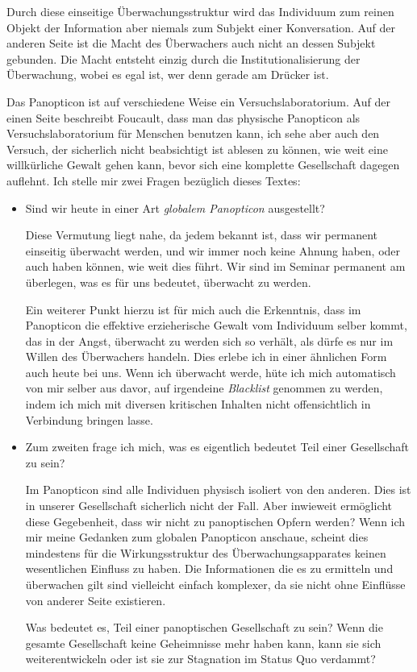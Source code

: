 \documentclass[a4paper,ngerman,11pt]{scrartcl}
\begin{document}
Durch diese einseitige Überwachungsstruktur wird das Individuum zum reinen
Objekt der Information aber niemals zum Subjekt einer
Konversation.\cite{Foucault1977} Auf der anderen Seite ist die Macht des
Überwachers auch nicht an dessen Subjekt gebunden. Die Macht entsteht einzig
durch die Institutionalisierung der Überwachung, wobei es egal ist, wer denn
gerade am Drücker ist.

Das Panopticon ist auf verschiedene Weise ein Versuchslaboratorium. Auf der
einen Seite beschreibt Foucault, dass man das physische Panopticon als
Versuchslaboratorium für Menschen benutzen kann, ich sehe aber auch den
Versuch, der sicherlich nicht beabsichtigt ist ablesen zu können, wie weit
eine willkürliche Gewalt gehen kann, bevor sich eine komplette Gesellschaft
dagegen auflehnt. Ich stelle mir zwei Fragen bezüglich dieses Textes:

\begin{itemize}
\item Sind wir heute in einer Art \emph{globalem Panopticon} ausgestellt?

Diese Vermutung liegt nahe, da jedem bekannt ist, dass wir permanent
einseitig überwacht werden, und wir immer noch keine Ahnung haben, oder auch
haben können, wie weit dies führt. Wir sind im Seminar permanent am
überlegen, was es für uns bedeutet, überwacht zu werden.

Ein weiterer Punkt hierzu ist für mich auch die Erkenntnis, dass im
Panopticon die effektive erzieherische Gewalt vom Individuum selber kommt,
das in der Angst, überwacht zu werden sich so verhält, als dürfe es nur im
Willen des Überwachers handeln. Dies erlebe ich in einer ähnlichen Form auch
heute bei uns. Wenn ich überwacht werde, hüte ich mich automatisch von mir
selber aus davor, auf irgendeine \emph{Blacklist} genommen zu werden, indem ich
mich mit diversen kritischen Inhalten nicht offensichtlich in Verbindung
bringen lasse.

\item Zum zweiten frage ich mich, was es eigentlich bedeutet Teil einer
Gesellschaft zu sein?

Im Panopticon sind alle Individuen physisch isoliert von den anderen. Dies
ist in unserer Gesellschaft sicherlich nicht der Fall. Aber inwieweit
ermöglicht diese Gegebenheit, dass wir nicht zu panoptischen Opfern werden?
Wenn ich mir meine Gedanken zum globalen Panopticon anschaue, scheint dies
mindestens für die Wirkungsstruktur des Überwachungsapparates keinen
wesentlichen Einfluss zu haben. Die Informationen die es zu ermitteln und
überwachen gilt sind vielleicht einfach komplexer, da sie nicht ohne
Einflüsse von anderer Seite existieren.

Was bedeutet es, Teil einer panoptischen Gesellschaft zu sein? Wenn die
gesamte Gesellschaft keine Geheimnisse mehr haben kann, kann sie sich
weiterentwickeln oder ist sie zur Stagnation im Status Quo verdammt?
\end{itemize}



\end{document}
